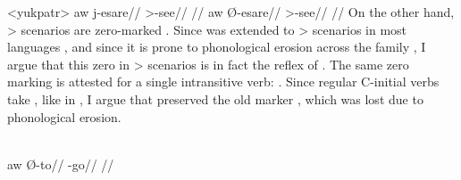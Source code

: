 \pex<yukpatr>\yukpa \parencite[][139]{meira2006syntactic}
\begingl
\gla aw j-esare//
\glb {} >-see//
\glft {}//
\endgl
{}
\begingl
\gla aw Ø-esare//
\glb {} >-see//
\glft {}//
\endgl
\xe
On the other hand, > scenarios are zero-marked .
Since \PC {}  was extended to > scenarios in most languages \parencite[81--82]{gildea1998}, and since it is prone to phonological erosion across the family , I argue that this zero in > scenarios is in fact the \yukpa reflex of .
The same zero marking is attested for a single intransitive verb:   .
Since regular C-initial verbs take , like  in , I argue that   preserved the old  marker , which was lost due to phonological erosion.

\yukpa \parencite[][139]{meira2006syntactic}\\
\begingl
\gla aw Ø-to//
\glb {} -go//
\glft {}//
\endgl
\xe